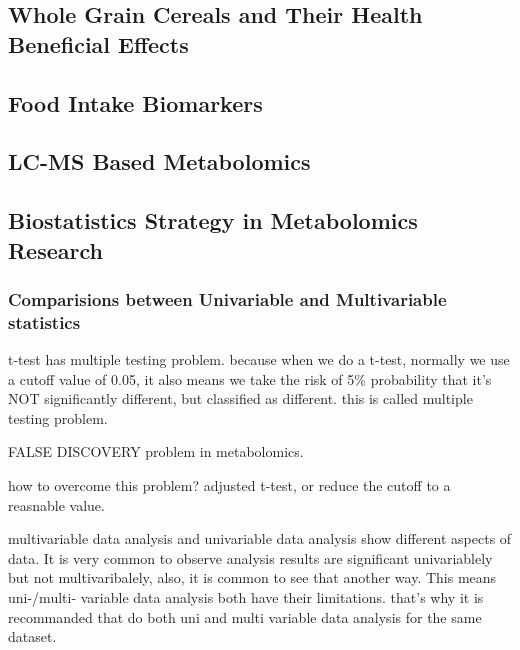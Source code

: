 
\subsection{Whole Grain Cereals and Their Health Beneficial Effects}
\subsection{Food Intake Biomarkers}
\subsection{LC-MS Based Metabolomics}
\subsection{Biostatistics Strategy in Metabolomics Research}
\subsubsection{Comparisions between Univariable and Multivariable statistics}
t-test has multiple testing problem. because when we do a t-test, normally we use a cutoff value of 0.05, it also means we take the risk of 5\% probability that it's NOT significantly different, but classified as different. this is called multiple testing problem. 

FALSE DISCOVERY problem in metabolomics.

how to overcome this problem? adjusted t-test, or reduce the cutoff to a reasnable value.

multivariable data analysis and univariable data analysis show different aspects of data. It is very common to observe analysis results are significant univariablely but not multivaribalely, also, it is common to see that another way. This means uni-/multi- variable data analysis both have their limitations. that's why it is recommanded that do both uni and multi variable data analysis for the same dataset.


